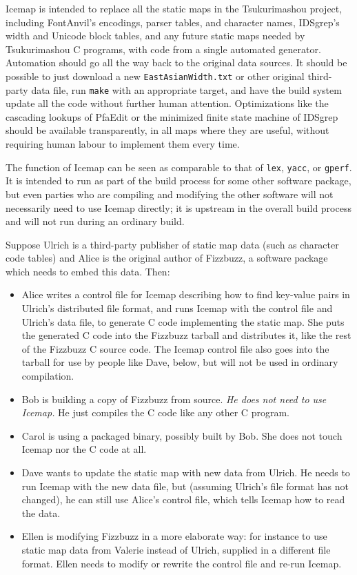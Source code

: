 \documentclass{mitsuba}
\begin{document}
Icemap is intended to replace all the static maps in the Tsukurimashou
project, including FontAnvil's encodings, parser tables, and character
names, IDSgrep's width and Unicode block tables, and any future static maps
needed by Tsukurimashou C programs, with code from a single automated
generator.  Automation should go all the way back to the original data
sources.  It should be possible to just download a new
\texttt{EastAsianWidth.txt} or other original third-party data file, run
\texttt{make} with an appropriate target, and have the build system update
all the code without further human attention.  Optimizations like the
cascading lookups of PfaEdit or the minimized finite state machine of
IDSgrep should be available transparently, in all maps where they are
useful, without requiring human labour to implement them every time.

The function of Icemap can be seen as comparable to that of \texttt{lex},
\texttt{yacc}, or \texttt{gperf}.  It is intended to run as part of the
build process for some other software package, but even parties who are
compiling and modifying the other software will not necessarily need to use
Icemap directly; it is upstream in the overall build process and will not
run during an ordinary build.

Suppose Ulrich is a third-party publisher of
static map data (such as character code tables) and Alice is the original
author of Fizzbuzz, a software package which needs to embed this data.  Then:

\begin{itemize}
  \item Alice writes a control file for Icemap describing how to find
    key-value pairs in Ulrich's distributed file format, and runs Icemap with
    the control file and Ulrich's data file, to generate C code implementing
    the static map.  She puts the generated C code into the Fizzbuzz tarball
    and distributes it, like the rest of the Fizzbuzz C source code. 
    The Icemap control file also goes into the tarball for use by people
    like Dave, below, but will not be used in ordinary compilation.
  \item Bob is building a copy of Fizzbuzz from source.  \emph{He
    does not need to use Icemap.}  He just compiles the C code like any
    other C program.
  \item Carol is using a packaged binary, possibly built by Bob.  She does
    not touch Icemap nor the C code at all.
  \item Dave wants to update the static map with new data from Ulrich.  He
    needs to run Icemap with the new data file, but (assuming Ulrich's file
    format has not changed), he can still use Alice's control file, which
    tells Icemap how to read the data.
  \item Ellen is modifying Fizzbuzz in a more elaborate way:  for instance
    to use static map data from Valerie instead of Ulrich, supplied in a
    different file format.  Ellen needs to modify or rewrite the control
    file and re-run Icemap.
\end{itemize}
\end{document}
